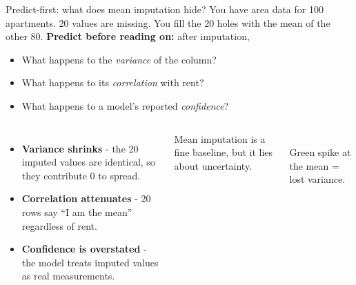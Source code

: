 \documentclass[aspectratio=169]{beamer}
\begin{document}
\begin{frame}{Predict-first: what does mean imputation hide?}
  You have area data for 100 apartments. 20 values are missing. You fill the 20 holes with the mean of the other 80.
  \vfill
  \pause
  \textbf{Predict before reading on:} after imputation,
  \begin{itemize}
    \item What happens to the \emph{variance} of the column?
    \item What happens to its \emph{correlation} with rent?
    \item What happens to a model's reported \emph{confidence}?
  \end{itemize}
  \vfill
  \pause
  \begin{columns}[T]
    \small
    \begin{itemize}
      \item \textbf{Variance shrinks} - the 20 imputed values are identical, so they contribute 0 to spread.
      \item \textbf{Correlation attenuates} - 20 rows say ``I am the mean'' regardless of rent.
      \item \textbf{Confidence is overstated} - the model treats imputed values as real measurements.
    \end{itemize}
    Mean imputation is a fine baseline, but it lies about uncertainty.
    \begin{center}
      \\[-3pt]
      \scriptsize Green spike at the mean = lost variance.
    \end{center}
  \end{columns}
\end{frame}
\end{document}
